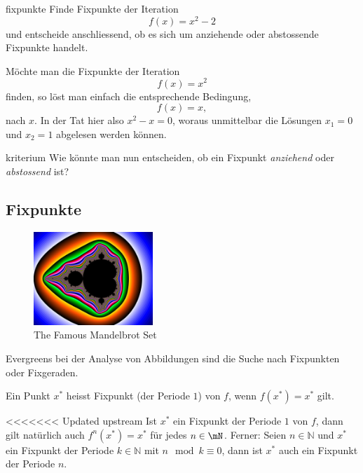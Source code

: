 \documentclass[%
<<<<<<< Updated upstream
<<<<<<< Updated upstream
11pt,%
twoside,%
titlepage,%
german,%
headsepline%
]{scrartcl}
\begin{document}
\begin{uebenv}{fixpunkte}
Finde Fixpunkte der Iteration
$$f(x)=x^2-2$$
und entscheide anschliessend, ob es sich um anziehende oder abstossende Fixpunkte handelt.
\end{uebenv}



\begin{bsp}
Möchte man die Fixpunkte der Iteration
$$f(x)=x^2$$
finden, so löst man einfach die entsprechende Bedingung,
$$f(x)=x,$$
nach $x$. In der Tat hier also $x^2-x=0$, woraus unmittelbar die Lösungen $x_1=0$ und $x_2=1$ abgelesen werden können.
\end{bsp}

\begin{uebenv}{kriterium}
Wie könnte man nun entscheiden, ob ein Fixpunkt \emph{anziehend} oder \emph{abstossend} ist?
\end{uebenv}




\subsection{Fixpunkte}
\begin{figure}
\centering
    \includegraphics[width=0.4\textwidth]{pictures/apfelmaennchen}
\caption{The Famous Mandelbrot Set}
\end{figure}

Evergreens bei der Analyse von Abbildungen sind die Suche nach Fixpunkten oder Fixgeraden.
\begin{cdef}[Fixpunkt]
Ein Punkt $x^*$ heisst Fixpunkt (der Periode $1$) von $f$, wenn $f(x^*)=x^*$ gilt.
\end{cdef}

\begin{bem}
<<<<<<< Updated upstream
Ist $x^*$ ein Fixpunkt der Periode $1$ von $f$, dann gilt natürlich auch $f^n(x^*)=x^*$ für jedes $n\in\mN$. Ferner: Seien $n\in\mathbb{N}$ und $x^*$ ein Fixpunkt der Periode $k\in\mathbb{N}$ mit $n\mod{k}\equiv0$, dann ist $x^*$ auch ein Fixpunkt der Periode $n$.
\end{bem}
\end{document}
